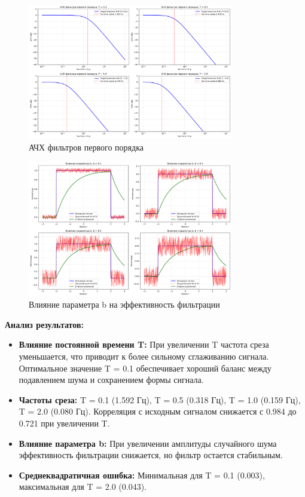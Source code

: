 \begin{figure}[H]
    \centering
    \includegraphics[width=0.8\textwidth]{images/task2/first_order_filter_frequency_response.png}
    \caption{АЧХ фильтров первого порядка}
    \label{fig:first_order_freq_response}
\end{figure}

\begin{figure}[H]
    \centering
    \includegraphics[width=0.8\textwidth]{images/task2/first_order_filter_b_influence.png}
    \caption{Влияние параметра b на эффективность фильтрации}
    \label{fig:first_order_b_influence}
\end{figure}

\textbf{Анализ результатов:}
\begin{itemize}
    \item \textbf{Влияние постоянной времени T:} При увеличении T частота среза уменьшается, что приводит к более сильному сглаживанию сигнала. Оптимальное значение T = 0.1 обеспечивает хороший баланс между подавлением шума и сохранением формы сигнала.
    
    \item \textbf{Частоты среза:} T = 0.1 (1.592 Гц), T = 0.5 (0.318 Гц), T = 1.0 (0.159 Гц), T = 2.0 (0.080 Гц). Корреляция с исходным сигналом снижается с 0.984 до 0.721 при увеличении T.
    
    \item \textbf{Влияние параметра b:} При увеличении амплитуды случайного шума эффективность фильтрации снижается, но фильтр остается стабильным.
    
    \item \textbf{Среднеквадратичная ошибка:} Минимальная для T = 0.1 (0.003), максимальная для T = 2.0 (0.043).
\end{itemize}

